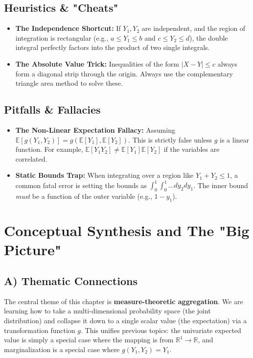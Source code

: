 \documentclass[11pt, a4paper]{article}
\theoremstyle{definition}
\theoremstyle{remark}
\newcommand{\R}{\mathbb{R}}
\newcommand{\E}{\mathbb{E}}
\begin{document}
\subsection{Heuristics \& "Cheats"}
\begin{itemize}
    \item \textbf{The Independence Shortcut:} If $Y_1, Y_2$ are independent, and the region of integration is rectangular (e.g., $a \leq Y_1 \leq b$ and $c \leq Y_2 \leq d$), the double integral perfectly factors into the product of two single integrals.
    \item \textbf{The Absolute Value Trick:} Inequalities of the form $|X - Y| \leq c$ always form a diagonal strip through the origin. Always use the complementary triangle area method to solve these.
\end{itemize}

\subsection{Pitfalls \& Fallacies}
\begin{itemize}
    \item \textbf{The Non-Linear Expectation Fallacy:} Assuming $\E[g(Y_1, Y_2)] = g(\E[Y_1], \E[Y_2])$. This is strictly false unless $g$ is a linear function. For example, $\E[Y_1 Y_2] \neq \E[Y_1]\E[Y_2]$ if the variables are correlated.
    \item \textbf{Static Bounds Trap:} When integrating over a region like $Y_1 + Y_2 \leq 1$, a common fatal error is setting the bounds as $\int_0^1 \int_0^1 \dots dy_2 dy_1$. The inner bound \textit{must} be a function of the outer variable (e.g., $1 - y_1$).
\end{itemize}

\section{Conceptual Synthesis and The "Big Picture"}

\subsection{A) Thematic Connections}
The central theme of this chapter is \textbf{measure-theoretic aggregation}. We are learning how to take a multi-dimensional probability space (the joint distribution) and collapse it down to a single scalar value (the expectation) via a transformation function $g$. This unifies previous topics: the univariate expected value is simply a special case where the mapping is from $\R^1 \to \R$, and marginalization is a special case where $g(Y_1, Y_2) = Y_1$.
\end{document}
